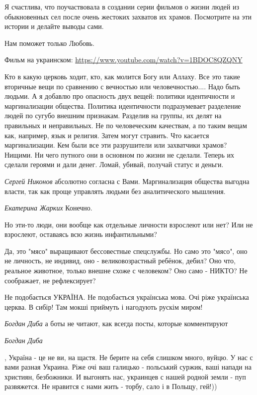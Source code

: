 Я счастлива, что поучаствовала в создании серии фильмов о жизни людей из
обыкновенных сел после очень жестоких захватов их храмов. Посмотрите на эти
истории и делайте выводы сами. 

Нам поможет только Любовь.

Фильм на украинском: \url{https://www.youtube.com/watch?v=1BDOC8QZQNY}
\begin{itemize}


Кто в какую церковь ходит, кто, как молится Богу или Аллаху. Все это такие
вторичные вещи по сравнению с вечностью или человечностью.... Надо быть людьми.
А я добавлю про опасность двух вещей: политики идентичности и маргинализации
общества. Политика идентичности подразумевает разделение людей по сугубо
внешним признакам. Разделив на группы, их делят на правильных и неправильных.
Не по человеческим качествам, а по таким вещам как, например, язык и религия.
Затем могут стравить. Что касается маргинализации. Кем были все эти разрушители
или захватчики храмов? Нищими. Ни чего путного они в основном по жизни не
сделали. Теперь их сделали героями и дали денег. Ломай, убивай, получай статус
и деньги. 

\emph{Сергей Никонов}
абсолютно согласна с Вами. Маргинализация общества выгодна власти, так как проще управлять людьми без аналитического мышления. 

\emph{Екатерина Жарких}
Конечно.

Но эти-то люди, они вообще как отдельные личности взрослеют или нет? Или не
взрослеют, оставаясь всю жизнь инфантильными?

Да, это "мясо" выращивают бессовестные спецслужбы. Но само это "мясо", оно не
личность, не индивид, оно - великовозрастный ребёнок, дебил? Оно что, реальное
животное, только внешне схоже с человеком? Оно само - НИКТО? Не соображает, не
рефлексирует?


Не подобається УКРАЇНА. Не подобається українська мова. Очі ріже українська
церква. В сибір! Там мокші приймуть і нагодують рускім миром!

\emph{Богдан Диба}
а боты не читают, как всегда посты, которые комментируют 

\emph{Богдан Диба}

, Україна - це не ви, на щастя. Не берите на себя слишком много, вуйцю. У нас с
вами разная Украина. Ріже очі ваш галицько - польський суржик, ваші напади на
християн, безбожники. И выгонять нас, украинцев с нашей родной земли - пуп
развяжется. Не нравится с нами жить - торбу, сало і в Польщу, гей!)) 


\end{itemize}
